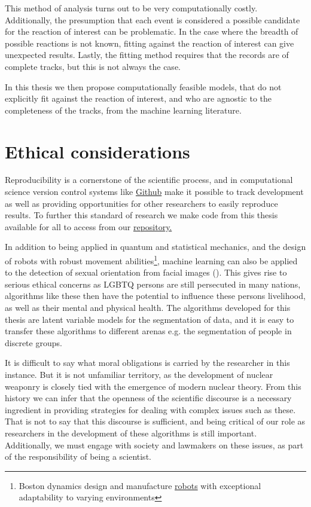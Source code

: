 This method of analysis turns out to be very computationally costly. Additionally, the presumption that each event is considered a possible candidate for the reaction of interest can be problematic. In the case where the breadth of possible reactions is not known, fitting against the reaction of interest can give unexpected results. Lastly, the fitting method requires that the records are of complete tracks, but this is not always the case.

In this thesis we then propose computationally feasible models, that do not explicitly fit against the reaction of interest, and who are agnostic to the completeness of the tracks, from the machine learning literature.

\section{Ethical considerations}

Reproducibility is a cornerstone of the scientific process, and in computational science version control systems like \href{https://github.com/}{Github} make it possible to track development as well as providing opportunities for other researchers to easily reproduce results. To further this standard of research we make code from this thesis available for all to access from our \href{https://github.com/ATTPC/VAE-event-classification}{repository.} 

In addition to being applied in quantum and statistical mechanics, and the design of robots with robust movement abilities\footnote{Boston dynamics design and manufacture \href{https://www.youtube.com/watch?v=LikxFZZO2sk}{robots} with exceptional adaptability to varying environments}, machine learning can also be applied to the detection of sexual orientation from facial images (\citet{Wang2018}). This gives rise to serious ethical concerns as LGBTQ persons are still persecuted in many nations, algorithms like these then have the potential to influence these persons livelihood, as well as their mental and physical health. The algorithms developed for this thesis are latent variable models for the segmentation of data, and it is easy to transfer these algorithms to different arenas e.g. the segmentation of people in discrete groups.

It is difficult to say what moral obligations is carried by the researcher in this instance. But it is not unfamiliar territory, as the development of nuclear weaponry is closely tied with the emergence of modern nuclear theory. From this history we can infer that the openness of the scientific discourse is a necessary ingredient in providing strategies for dealing with complex issues such as these. That is not to say that this discourse is sufficient, and being critical of our role as researchers in the development of these algorithms is still important. Additionally, we must engage with society and lawmakers on these issues, as part of the responsibility of being a scientist. 

